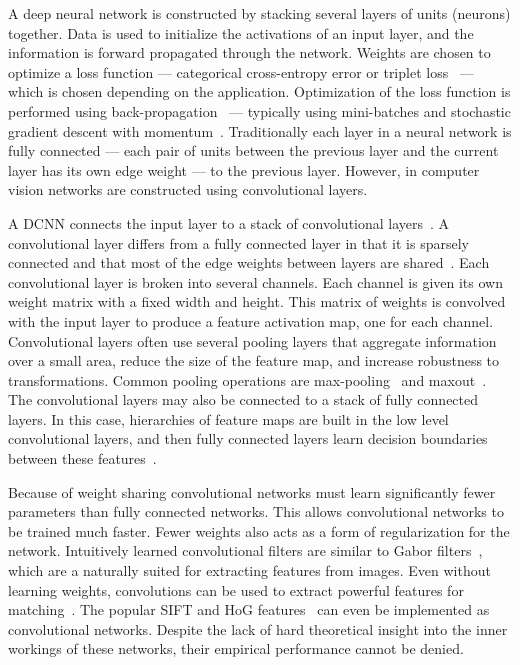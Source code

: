     A deep neural network is constructed by stacking several layers of units (neurons) together.
    Data is used to initialize the activations of an input layer, and the information is forward propagated
      through the network.
    Weights are chosen to optimize a loss function --- \eg{} categorical cross-entropy error or triplet
      loss~\cite{schroff_facenet_2015} --- which is chosen depending on the application.
    Optimization of the loss function is performed using back-propagation~\cite{rumelhart_learning_1986} ---
      typically using mini-batches and stochastic gradient descent with momentum~\cite{sutskever_importance_2013}.
    Traditionally each layer in a neural network is fully connected --- each pair of units between the previous
      layer and the current layer has its own edge weight ---  to the previous layer.
    However, in computer vision networks are constructed using convolutional layers.

    A DCNN connects the input layer to a stack of convolutional layers~\cite{krizhevsky_imagenet_2012}.
    A convolutional layer differs from a fully connected layer in that it is sparsely connected and that most of
      the edge weights between layers are shared~\cite{lecun_gradient_based_1998, fukushima_neocognitron_1988,
      serre_robust_2007}.
    Each convolutional layer is broken into several channels.
    Each channel is given its own weight matrix with a fixed width and height.
    This matrix of weights is convolved with the input layer to produce a feature activation map, one for each
      channel.
    Convolutional layers often use several pooling layers that aggregate information over a small area, reduce
      the size of the feature map, and increase robustness to transformations.
    Common pooling operations are max-pooling~\cite{serre_robust_2007, krizhevsky_imagenet_2012} and
      maxout~\cite{goodfellow_maxout_2013}.
    The convolutional layers may also be connected to a stack of fully connected layers.
    In this case, hierarchies of feature maps are built in the low level convolutional layers, and then fully
      connected layers learn decision boundaries between these features~\cite{zeiler_visualizing_2014}.

    Because of weight sharing convolutional networks must learn significantly fewer parameters than fully
      connected networks.
    This allows convolutional networks to be trained much faster.
    Fewer weights also acts as a form of regularization for the network.
    Intuitively learned convolutional filters are similar to Gabor filters~\cite{gabor_theory_1946}, which are a
      naturally suited for extracting features from images.
    Even without learning weights, convolutions can be used to extract powerful features for
      matching~\cite{revaud_deep_2015}.
    The popular SIFT and HoG features~\cite{mahendran_understanding_2014} can even be implemented as
      convolutional networks.
    Despite the lack of hard theoretical insight into the inner workings of these networks, their empirical
      performance cannot be denied.

